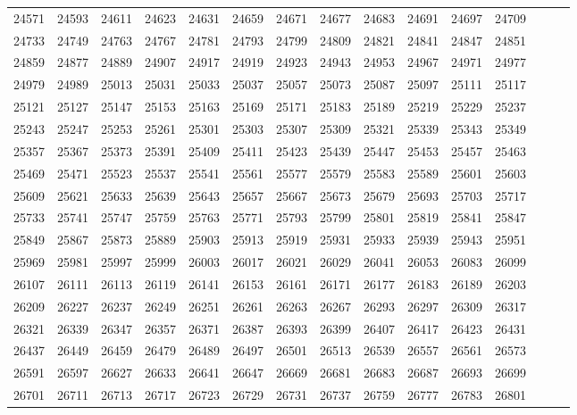 \documentclass[10pt, a4paper]{article}
\begin{document}
\begin{center}
\begin{longtable}{c c c c c c c c c c c c c c c}
        24571 & 24593 & 24611 & 24623 & 24631 & 24659 & 24671 & 24677 & 24683 & 24691 & 24697 & 24709 \\
        24733 & 24749 & 24763 & 24767 & 24781 & 24793 & 24799 & 24809 & 24821 & 24841 & 24847 & 24851 \\
        24859 & 24877 & 24889 & 24907 & 24917 & 24919 & 24923 & 24943 & 24953 & 24967 & 24971 & 24977 \\
        24979 & 24989 & 25013 & 25031 & 25033 & 25037 & 25057 & 25073 & 25087 & 25097 & 25111 & 25117 \\
        25121 & 25127 & 25147 & 25153 & 25163 & 25169 & 25171 & 25183 & 25189 & 25219 & 25229 & 25237 \\
        25243 & 25247 & 25253 & 25261 & 25301 & 25303 & 25307 & 25309 & 25321 & 25339 & 25343 & 25349 \\
        25357 & 25367 & 25373 & 25391 & 25409 & 25411 & 25423 & 25439 & 25447 & 25453 & 25457 & 25463 \\
        25469 & 25471 & 25523 & 25537 & 25541 & 25561 & 25577 & 25579 & 25583 & 25589 & 25601 & 25603 \\
        25609 & 25621 & 25633 & 25639 & 25643 & 25657 & 25667 & 25673 & 25679 & 25693 & 25703 & 25717 \\
        25733 & 25741 & 25747 & 25759 & 25763 & 25771 & 25793 & 25799 & 25801 & 25819 & 25841 & 25847 \\
        25849 & 25867 & 25873 & 25889 & 25903 & 25913 & 25919 & 25931 & 25933 & 25939 & 25943 & 25951 \\
        25969 & 25981 & 25997 & 25999 & 26003 & 26017 & 26021 & 26029 & 26041 & 26053 & 26083 & 26099 \\
        26107 & 26111 & 26113 & 26119 & 26141 & 26153 & 26161 & 26171 & 26177 & 26183 & 26189 & 26203 \\
        26209 & 26227 & 26237 & 26249 & 26251 & 26261 & 26263 & 26267 & 26293 & 26297 & 26309 & 26317 \\
        26321 & 26339 & 26347 & 26357 & 26371 & 26387 & 26393 & 26399 & 26407 & 26417 & 26423 & 26431 \\
        26437 & 26449 & 26459 & 26479 & 26489 & 26497 & 26501 & 26513 & 26539 & 26557 & 26561 & 26573 \\
        26591 & 26597 & 26627 & 26633 & 26641 & 26647 & 26669 & 26681 & 26683 & 26687 & 26693 & 26699 \\
        26701 & 26711 & 26713 & 26717 & 26723 & 26729 & 26731 & 26737 & 26759 & 26777 & 26783 & 26801 \\

\end{longtable}
\end{center}
\end{document}
